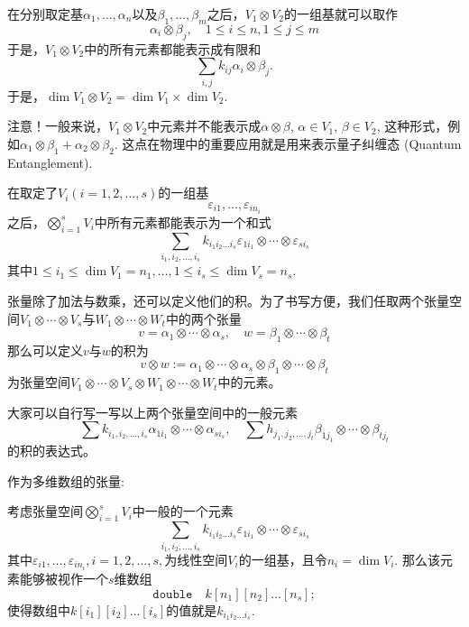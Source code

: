 在分别取定基$\alpha_1,\ldots,\alpha_n$以及$\beta_1,\ldots,\beta_m$之后，$V_1\otimes V_2$的一组基就可以取作
$$\alpha_i\otimes \beta_j, \quad 1\leqslant i\leqslant n, 1\leqslant j\leqslant m$$
于是，$V_1\otimes V_2$中的所有元素都能表示成有限和
$$\sum\limits_{i,j} k_{ij} \alpha_i\otimes \beta_j.$$
于是，$\dim V_1\otimes V_2 = \dim V_1 \times \dim V_2.$

{\color{red}注意}！一般来说，$V_1\otimes V_2$中元素并不能表示成$\alpha\otimes\beta$, $\alpha\in V_1$, $\beta\in V_2$, 这种形式，例如$\alpha_1\otimes \beta_1 + \alpha_2\otimes\beta_2$. 这点在物理中的重要应用就是用来表示量子纠缠态 (Quantum Entanglement).

在取定了$V_i (i=1,2,\ldots,s)$的一组基
$$\varepsilon_{i1},\ldots,\varepsilon_{in_i}$$
之后，$\bigotimes\limits_{i=1}^s V_i$中所有元素都能表示为一个和式
$$\sum\limits_{i_1,i_2,\ldots,i_s} k_{i_1i_2\ldots i_s} \varepsilon_{1i_1} \otimes \cdots \otimes \varepsilon_{si_s}$$
其中$1\leqslant i_1\leqslant \dim V_1 = n_1, \ldots, 1\leqslant i_s\leqslant \dim V_s = n_s$.

张量除了加法与数乘，还可以定义他们的积。为了书写方便，我们任取两个张量空间$V_1\otimes\cdots\otimes V_s$与$W_1\otimes\cdots\otimes W_t$中的两个张量
$$v = \alpha_1\otimes\cdots\otimes \alpha_s, \quad w = \beta_1\otimes\cdots\otimes \beta_t$$
那么可以定义$v$与$w$的积为
$$v\otimes w := \alpha_1\otimes\cdots\otimes \alpha_s \otimes \beta_1\otimes\cdots\otimes \beta_t$$
为张量空间$V_1\otimes\cdots\otimes V_s\otimes W_1\otimes\cdots\otimes W_t$中的元素。

大家可以自行写一写以上两个张量空间中的一般元素
$$\sum k_{i_1,i_2,\ldots,i_s}\alpha_{1i_1} \otimes \cdots \otimes \alpha_{si_s}, \quad \sum h_{j_1,j_2,\ldots,j_t}\beta_{1j_1} \otimes \cdots \otimes \beta_{tj_t}$$
的积的表达式。

作为多维数组的张量:

考虑张量空间$\bigotimes\limits_{i=1}^s V_i$中一般的一个元素
$$\sum\limits_{i_1,i_2,\ldots,i_s} k_{i_1i_2\ldots i_s} \varepsilon_{1i_1} \otimes \cdots \otimes \varepsilon_{si_s}$$
其中$\varepsilon_{i1},\ldots,\varepsilon_{in_i}, i=1,2,\ldots,s,$为线性空间$V_i $的一组基，且令$n_i = \dim V_i$. 那么该元素能够被视作一个$s$维数组
$$
\texttt{double} \quad k[n_1][n_2]...[n_s];
$$
使得数组中$k[i_1][i_2]...[i_s]$的值就是$k_{i_1i_2\ldots i_s}$.


